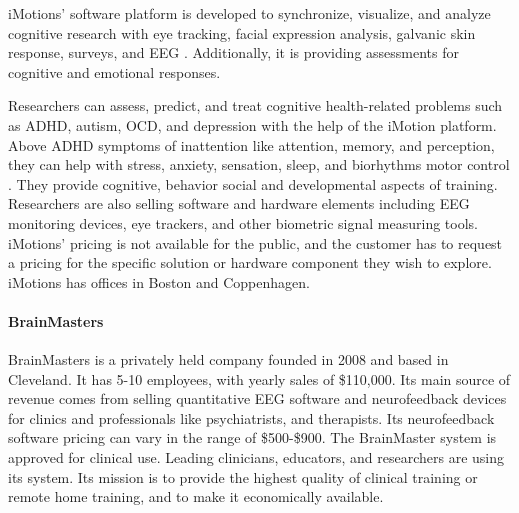 \documentclass[letterpaper,10pt]{article}
\begin{document}
iMotions’ software platform is developed to synchronize, visualize, and analyze cognitive research with eye tracking, facial expression analysis, galvanic skin response, surveys, and EEG . Additionally, it is providing assessments for cognitive and emotional responses.

\cite{pitchbook}

Researchers can assess, predict, and treat cognitive health-related problems such as ADHD, autism, OCD, and depression with the help of the iMotion platform. Above ADHD symptoms of inattention like attention, memory, and perception, they can help with stress, anxiety, sensation, sleep, and biorhythms motor control . They provide cognitive, behavior social and developmental aspects of training. Researchers are also selling software and hardware elements including EEG monitoring devices, eye trackers, and other biometric signal measuring tools.
iMotions’ pricing is not available for the public, and the customer has to request a pricing for the specific solution or hardware component they wish to explore. iMotions has offices in Boston and Coppenhagen. 

\cite{imotions}

\paragraph{BrainMasters}

BrainMasters is a privately held company founded in 2008 and based in Cleveland. It has 5-10 employees, with yearly sales of \$110,000. Its main source of revenue comes from selling quantitative EEG software and neurofeedback devices for clinics and professionals like psychiatrists, and therapists. Its neurofeedback software pricing can vary in the range of \$500-\$900.
The BrainMaster system is approved for clinical use. Leading clinicians, educators, and researchers are using its system. Its mission is to provide the highest quality of clinical training or remote home training, and to make it economically available.
\end{document}
